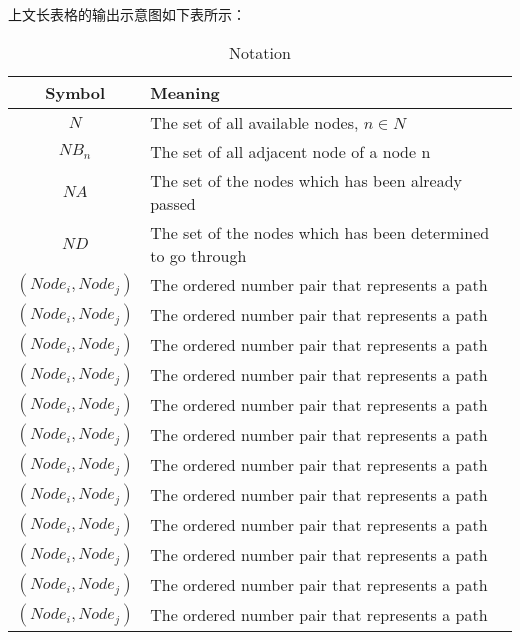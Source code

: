 \documentclass{nitthesis}
\begin{document}
上文长表格的输出示意图如下表所示：

\begin{longtable}{cp{12cm}}   %
    \caption{Notation}  %
    \label{table.longtable}    \\
    \toprule    %
    \textbf{Symbol}    & \textbf{Meaning}                                                                             \\
    \midrule
    \endhead    %
    
    \bottomrule 
    \endfoot    %
    $N$                & The set of all available nodes, $n \in N$                                                    \\
    $NB_n$             & The set of all adjacent node of a node n                                                     \\
    $NA$               & The set of the nodes which has been already passed                                           \\
    $ND$               & The set of the nodes which has been determined to go through                                 \\
    $(Node_i, Node_j)$ & The ordered number pair that represents a path                                               \\
    $(Node_i, Node_j)$ & The ordered number pair that represents a path                                               \\
    $(Node_i, Node_j)$ & The ordered number pair that represents a path                                               \\
    $(Node_i, Node_j)$ & The ordered number pair that represents a path                                               \\
    $(Node_i, Node_j)$ & The ordered number pair that represents a path                                               \\
    $(Node_i, Node_j)$ & The ordered number pair that represents a path                                               \\
    $(Node_i, Node_j)$ & The ordered number pair that represents a path                                               \\
    $(Node_i, Node_j)$ & The ordered number pair that represents a path                                               \\
    $(Node_i, Node_j)$ & The ordered number pair that represents a path                                               \\
    $(Node_i, Node_j)$ & The ordered number pair that represents a path                                               \\
    $(Node_i, Node_j)$ & The ordered number pair that represents a path                                               \\
    $(Node_i, Node_j)$ & The ordered number pair that represents a path                                               \\

\end{longtable}
\end{document}
